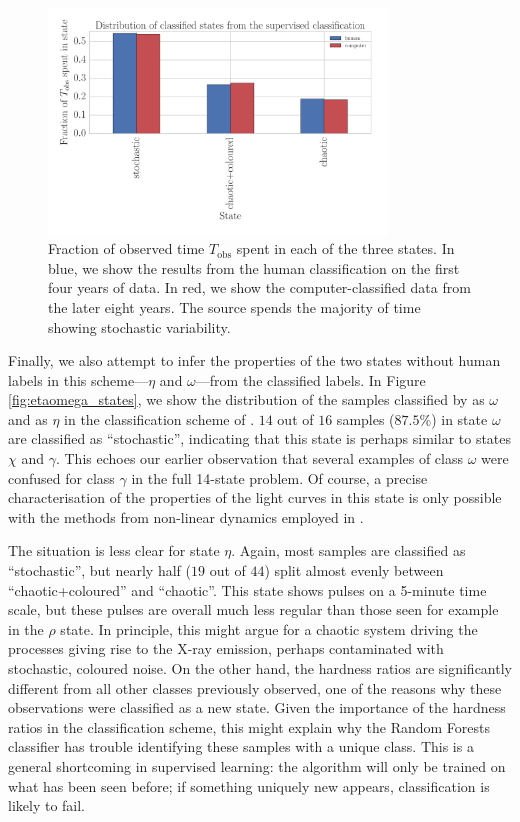 \documentclass[12pt]{emulateapj}
\begin{document}
\begin{figure}[htbp]
\begin{center}
\includegraphics[width=9cm]{grs1915_supervised_phys_states_histogram.pdf}
\caption{Fraction of observed time $T_{\mathrm{obs}}$ spent in each of the three states. In blue, we show the results from the human classification on the first four 
years of data. In red, we show the computer-classified data from the later eight years. The source spends the majority of time showing stochastic variability.} 
\label{fig:duration_phys}
\end{center}
\end{figure}

Finally, we also  attempt to infer the properties of the two states without human labels in this scheme---$\eta$ and $\omega$---from the classified labels. 
In Figure \ref{fig:etaomega_states}, we show the distribution of the samples classified by \citet{kleinwolt2002} as $\omega$ and \citet{hannikainen2004} as $\eta$ 
in the classification scheme of \citet{harikrishnan2011}. $14$ out of $16$ samples ($87.5\%$) in state $\omega$ are classified as ``stochastic'', indicating that 
this state is perhaps similar to states $\chi$ and $\gamma$. This echoes our earlier observation that several examples of class $\omega$ were confused for 
class $\gamma$ in the full 14-state problem. Of course, a precise characterisation of the properties of the light curves in this state is only possible with the 
methods from non-linear dynamics employed in \citet{harikrishnan2011}. 

The situation is less clear for state $\eta$. Again, most samples are classified as ``stochastic'', but nearly half ($19$ out of $44$) split almost evenly between 
``chaotic+coloured'' and ``chaotic''. This state shows pulses on a 5-minute time scale, but these pulses are overall much less regular than those 
seen for example in the $\rho$ state. In principle, this  might argue for a chaotic system driving the processes giving rise to the X-ray emission, perhaps contaminated 
with stochastic, coloured noise. On the other hand, the hardness ratios are significantly different from all other classes previously observed, one of the reasons why 
these observations were classified as a new state. Given the importance of the hardness ratios in the classification scheme, this might explain why the 
Random Forests classifier has trouble identifying these samples with a unique class. This is a general shortcoming in supervised learning: the algorithm will only 
be trained on what has been seen before; if something uniquely new appears, classification is likely to fail.
\end{document}
